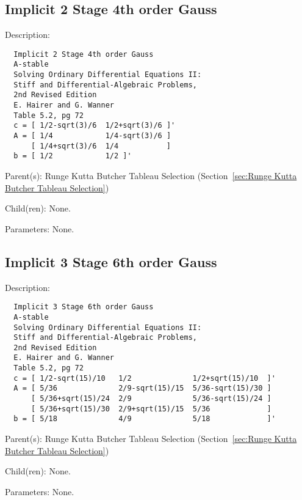 \subsection{Implicit 2 Stage 4th order Gauss}
\label{sec:Implicit 2 Stage 4th order Gauss}

\begin{list}{}
  {\setlength{\leftmargin}{1.0in}
   \setlength{\labelwidth}{0.75in}
   \setlength{\labelsep}{0.125in}}
  \item[Description:]
\begin{verbatim}
  Implicit 2 Stage 4th order Gauss
  A-stable
  Solving Ordinary Differential Equations II:
  Stiff and Differential-Algebraic Problems,
  2nd Revised Edition
  E. Hairer and G. Wanner
  Table 5.2, pg 72
  c = [ 1/2-sqrt(3)/6  1/2+sqrt(3)/6 ]'
  A = [ 1/4            1/4-sqrt(3)/6 ]
      [ 1/4+sqrt(3)/6  1/4           ]
  b = [ 1/2            1/2 ]'
\end{verbatim}
  \item[Parent(s):]
    Runge Kutta Butcher Tableau Selection (Section~\ref{sec:Runge Kutta Butcher Tableau Selection})
  \item[Child(ren):]
    None. 
  \item[Parameters:]
    None. 
\end{list}

\subsection{Implicit 3 Stage 6th order Gauss}
\label{sec:Implicit 3 Stage 6th order Gauss}

\begin{list}{}
  {\setlength{\leftmargin}{1.0in}
   \setlength{\labelwidth}{0.75in}
   \setlength{\labelsep}{0.125in}}
  \item[Description:]
\begin{verbatim}
  Implicit 3 Stage 6th order Gauss
  A-stable
  Solving Ordinary Differential Equations II:
  Stiff and Differential-Algebraic Problems,
  2nd Revised Edition
  E. Hairer and G. Wanner
  Table 5.2, pg 72
  c = [ 1/2-sqrt(15)/10   1/2              1/2+sqrt(15)/10  ]'
  A = [ 5/36              2/9-sqrt(15)/15  5/36-sqrt(15)/30 ]
      [ 5/36+sqrt(15)/24  2/9              5/36-sqrt(15)/24 ]
      [ 5/36+sqrt(15)/30  2/9+sqrt(15)/15  5/36             ]
  b = [ 5/18              4/9              5/18             ]'
\end{verbatim}
  \item[Parent(s):]
    Runge Kutta Butcher Tableau Selection (Section~\ref{sec:Runge Kutta Butcher Tableau Selection})
  \item[Child(ren):]
    None. 
  \item[Parameters:]
    None. 
\end{list}


